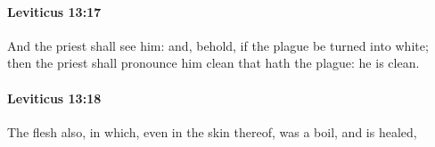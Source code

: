 		\paragraph{Leviticus 13:17} %
			\label{LEVITICUS-13-17}

			And the priest shall see him: and, behold, if the plague be turned into white; then the priest shall pronounce him clean that hath the plague: he is clean.


		\paragraph{Leviticus 13:18} %
			\label{LEVITICUS-13-18}

			The flesh also, in which, even in the skin thereof, was a boil, and is healed,


